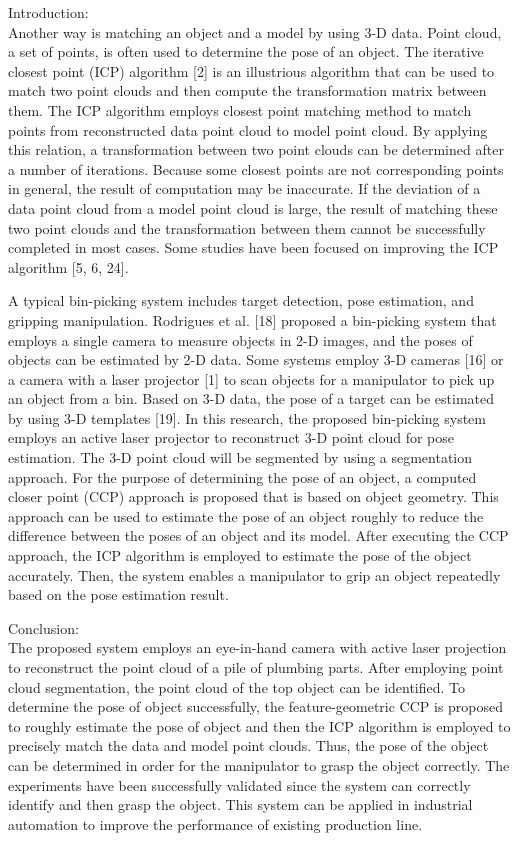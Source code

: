 \documentclass[10]{article}
\begin{document}
Introduction:\\
Another way is matching an object and a model by using 3-D data. Point cloud, a set of points, is often used to determine the pose of an object. The iterative closest point (ICP) algorithm [2] is an illustrious algorithm that can be used to match two point clouds and then compute the transformation matrix between them. The ICP algorithm employs closest point matching method to match points from reconstructed data point cloud to model point cloud. By applying this relation, a transformation between two point clouds can be determined after a number of iterations. Because some closest points are not corresponding points in general, the result of computation may be inaccurate. If the deviation of a data point cloud from a model point cloud is large, the result of matching these two point clouds and the transformation between them cannot be successfully completed in most cases. Some studies have been focused on improving the ICP algorithm [5, 6, 24].

A typical bin-picking system includes target detection, pose estimation, and gripping manipulation. Rodrigues et al. [18] proposed a bin-picking system that employs a single camera to measure objects in 2-D images, and the poses of objects can be estimated by 2-D data. Some systems employ 3-D cameras [16] or a camera with a laser projector [1] to scan objects for a manipulator to pick up an object from a bin. Based on 3-D data, the pose of a target can be estimated by using 3-D templates [19]. In this research, the proposed bin-picking system employs an active laser projector to reconstruct 3-D point cloud for pose estimation. The 3-D point cloud will be segmented by using a segmentation approach. For the purpose of determining the pose of an object, a computed closer point (CCP) approach is proposed that is based on object geometry. This approach can be used to estimate the pose of an object roughly to reduce the difference between the poses of an object and its model. After executing the CCP approach, the ICP algorithm is employed to estimate the pose of the object accurately. Then, the system enables a manipulator to grip an object repeatedly based on the pose estimation result.

Conclusion:\\
The proposed system employs an eye-in-hand camera with active laser projection to reconstruct the point cloud of a pile of plumbing parts. After employing point cloud segmentation, the point cloud of the top object can be identified. To determine the pose of object successfully, the feature-geometric CCP is proposed to roughly estimate the pose of object and then the ICP algorithm is employed to precisely match the data and model point clouds. Thus, the pose of the object can be determined in order for the manipulator to grasp the object correctly. The experiments have been successfully validated since the system can correctly identify and then grasp the object. This system can be applied in industrial automation to improve the performance of existing production line.
\end{document}
